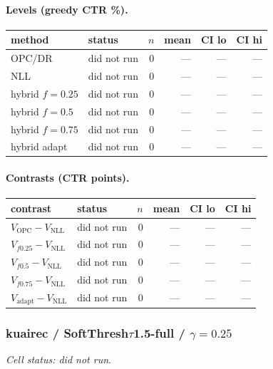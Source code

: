 \documentclass[10pt,a4paper]{article}
\begin{document}
\paragraph{Levels (greedy CTR \%).}
{\centering\small\begin{tabular}{llrrrr}
\toprule method & status & $n$ & mean & CI lo & CI hi \\
\midrule
OPC/DR & did not run & 0 & --- & --- & --- \\
NLL & did not run & 0 & --- & --- & --- \\
hybrid $f{=}0.25$ & did not run & 0 & --- & --- & --- \\
hybrid $f{=}0.5$ & did not run & 0 & --- & --- & --- \\
hybrid $f{=}0.75$ & did not run & 0 & --- & --- & --- \\
hybrid adapt & did not run & 0 & --- & --- & --- \\
\bottomrule\end{tabular}\par}
\paragraph{Contrasts (CTR points).}
{\centering\small\begin{tabular}{llrrrr}
\toprule contrast & status & $n$ & mean & CI lo & CI hi \\
\midrule
$V_{\mathrm{OPC}}-V_{\mathrm{NLL}}$ & did not run & 0 & --- & --- & --- \\
$V_{f0.25}-V_{\mathrm{NLL}}$ & did not run & 0 & --- & --- & --- \\
$V_{f0.5}-V_{\mathrm{NLL}}$ & did not run & 0 & --- & --- & --- \\
$V_{f0.75}-V_{\mathrm{NLL}}$ & did not run & 0 & --- & --- & --- \\
$V_{\mathrm{adapt}}-V_{\mathrm{NLL}}$ & did not run & 0 & --- & --- & --- \\
\bottomrule\end{tabular}\par}
\bigskip
\subsubsection{kuairec / SoftThresh$\tau$1.5-full / $\gamma=0.25$}
\emph{Cell status: did not run}.
\end{document}
